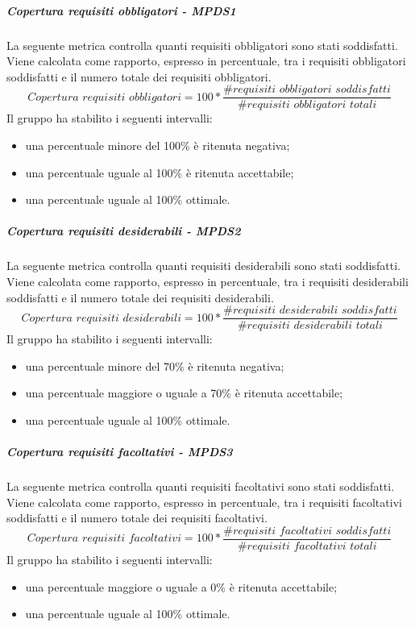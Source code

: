 \documentclass[PianoDiQualifica.tex]{subfiles}
\begin{document}
				\hypertarget{req_obbligatori}{\subparagraph{Copertura requisiti obbligatori - MPDS1}}
				La seguente metrica controlla quanti requisiti obbligatori sono stati soddisfatti. Viene calcolata come rapporto, espresso in percentuale, tra i requisiti obbligatori soddisfatti e
				il numero totale dei requisiti obbligatori. \\
				\begin{equation}\textit{Copertura requisiti obbligatori} = 100 * \frac{\textit{\#requisiti obbligatori soddisfatti}}{\textit{\#requisiti obbligatori totali}}\end{equation}
				Il gruppo ha stabilito i seguenti intervalli:
				\begin{itemize}
					\item una percentuale minore del 100\% è ritenuta negativa;
					\item una percentuale uguale al 100\% è ritenuta accettabile;
					\item una percentuale uguale al 100\% ottimale.
				\end{itemize}
				
				\hypertarget{req_desiderabili}{\subparagraph{Copertura requisiti desiderabili - MPDS2}}
				La seguente metrica controlla quanti requisiti desiderabili sono stati soddisfatti. Viene calcolata come rapporto, espresso in percentuale, tra i requisiti desiderabili soddisfatti e
				il numero totale dei requisiti desiderabili. \\
				\begin{equation}\textit{Copertura requisiti desiderabili} = 100 * \frac{\textit{\#requisiti desiderabili soddisfatti}}{\textit{\#requisiti desiderabili totali}}\end{equation}
				Il gruppo ha stabilito i seguenti intervalli:
				\begin{itemize}
					\item una percentuale minore del 70\% è ritenuta negativa;
					\item una percentuale maggiore o uguale a 70\% è ritenuta accettabile;
					\item una percentuale uguale al 100\% ottimale.
				\end{itemize}
				
							\hypertarget{req_facoltativi}{\subparagraph{Copertura requisiti facoltativi - MPDS3}}
				La seguente metrica controlla quanti requisiti facoltativi sono stati soddisfatti. Viene calcolata come rapporto, espresso in percentuale, tra i requisiti facoltativi soddisfatti e
				il numero totale dei requisiti facoltativi. \\
				\begin{equation}\textit{Copertura requisiti facoltativi} = 100 * \frac{\textit{\#requisiti facoltativi soddisfatti}}{\textit{\#requisiti facoltativi totali}}\end{equation}
				Il gruppo ha stabilito i seguenti intervalli:
				\begin{itemize}
					\item una percentuale maggiore o uguale a 0\% è ritenuta accettabile;
					\item una percentuale uguale al 100\% ottimale.
				\end{itemize}
				
\end{document}

